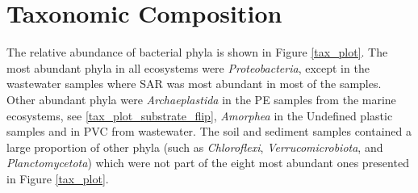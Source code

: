 \newpage
\section{Taxonomic Composition}
The relative abundance of bacterial phyla is shown in Figure \ref{tax_plot}.
The most abundant phyla in all ecosystems were \emph{Proteobacteria}, except in the wastewater samples where SAR was most abundant in most of the samples.
Other abundant phyla were \emph{Archaeplastida} in the PE samples from the marine ecosystems, see \ref{tax_plot_substrate_flip}, \emph{Amorphea} in the Undefined plastic samples and in PVC from wastewater. The soil and sediment samples contained a large proportion of other phyla (such as \emph{Chloroflexi}, \emph{Verrucomicrobiota}, and \emph{Planctomycetota}) which were not part of the eight most abundant ones presented in Figure \ref{tax_plot}.





